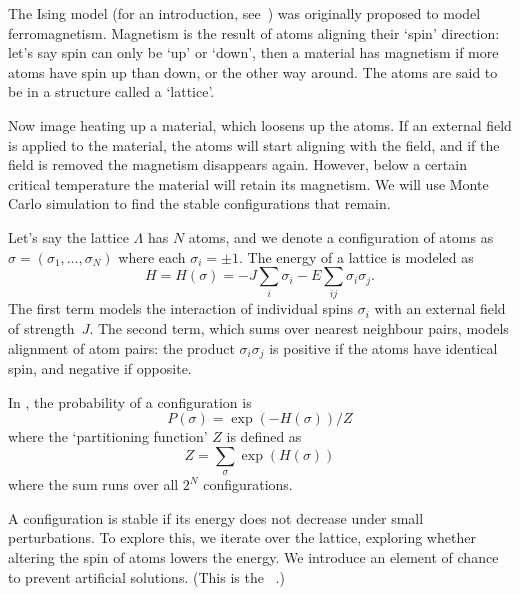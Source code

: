 
The Ising model (for an introduction, see~\cite{Cipra:Ising}) was
originally proposed to model ferromagnetism. Magnetism is the result
of atoms aligning their `spin' direction: let's say spin can only be
`up' or `down', then a material has magnetism if more atoms have spin
up than down, or the other way around. The atoms are said to be in a
structure called a `lattice'.

Now image heating up a material, which loosens up the atoms. If an
external field is applied to the material, the atoms will start
aligning with the field, and if the field is removed the magnetism
disappears again. However, below a certain critical temperature the
material will retain its magnetism.
We will use Monte Carlo simulation to find the stable configurations
that remain.

Let's say the lattice $\Lambda$ has $N$ atoms, and we denote a
configuration of atoms as $\sigma=(\sigma_1,\ldots,\sigma_N)$ where
each $\sigma_i=\pm1$.
The energy of a lattice is modeled as
\[ H=H(\sigma)=-J\sum_i\sigma_i-E\sum_{ij}\sigma_i\sigma_j. \]
The first term models the interaction of individual spins $\sigma_i$
with an external field of strength~$J$. The second term, which sums
over nearest neighbour pairs, models
alignment of atom pairs: the product $\sigma_i\sigma_j$ is positive if
the atoms have identical spin, and negative if opposite.

In , the probability of a
configuration is 
\[ P(\sigma) = \exp(-H(\sigma))/Z \]
where the `partitioning function' $Z$ is defined as 
\[ Z = \sum_\sigma \exp(H(\sigma)) \]
where the sum runs over all $2^N$ configurations.

A configuration is stable if its energy does not decrease under small
perturbations. To explore this, we iterate over the lattice, exploring
whether altering the spin of atoms lowers the energy. We introduce an
element of chance to prevent artificial solutions. (This is the
~\cite{Metropolis}.)

